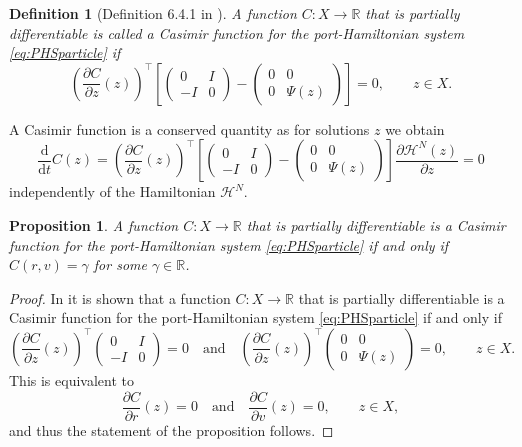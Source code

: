 \documentclass[11pt]{article}
\newtheorem{definition}[theorem]{Definition}
\newtheorem{proposition}[theorem]{Proposition}
\newcommand{\R}[0]{\mathbb R}
\newcommand{\calH}[0]{\mathcal H}
\newcommand{\dd}[0]{\mathrm d}
\begin{document}
\begin{bibunit}[abbrv]
\begin{definition}[Definition 6.4.1 in \cite{schaft2000l2}]
A function $C:X\rightarrow \R$ that is partially differentiable is called a \emph{Casimir function} for the port-Hamiltonian system \eqref{eq:PHSparticle} if
\[  \left(\frac{\partial C}{\partial z}(z)\right)^\top \left[ \begin{pmatrix} 0 & I \\ -I & 0 \end{pmatrix} - \begin{pmatrix} 0 & 0 \\ 0 & \Psi(z) \end{pmatrix} \right]=0, \qquad z\in X.\]
\end{definition}

A Casimir function is a conserved quantity as for solutions $z$ we obtain
\[ \frac{\dd}{\dd t} C(z) = \left(\frac{\partial C}{\partial z}(z)\right)^\top \left[ \begin{pmatrix} 0 & I \\ -I & 0 \end{pmatrix} - \begin{pmatrix} 0 & 0 \\ 0 & \Psi(z) \end{pmatrix} \right]\frac{\partial \calH^N(z)}{\partial z} =0\]
independently of the Hamiltonian $\calH^N$.

\begin{proposition}
A function $C:X\rightarrow \R$ that is partially differentiable is  a Casimir function for the port-Hamiltonian system  \eqref{eq:PHSparticle} if and only if 
$ C(r,v) =  \gamma$
for some $ \gamma \in \R$.
\end{proposition}
\begin{proof}
In \cite{schaft2000l2} it is shown that a function $C:X\rightarrow \R$ that is partially differentiable is  a Casimir function for the port-Hamiltonian system \eqref{eq:PHSparticle} if and only if 
\[  \left(\frac{\partial C}{\partial z}(z)\right)^\top  \begin{pmatrix} 0 & I \\ -I & 0 \end{pmatrix} =0 \quad \text{and} \quad \left(\frac{\partial C}{\partial z}(z)\right)^\top   \begin{pmatrix} 0 & 0 \\ 0 & \Psi(z) \end{pmatrix}=0, \qquad z\in X.\]
This is equivalent to
\[   \frac{\partial C}{\partial r}(z)  =0 \quad \text{and} \quad  \frac{\partial C}{\partial v}(z)=0, \qquad z\in X,\]
 and thus the statement of the proposition follows.
\end{proof}



\end{bibunit}
\end{document}
